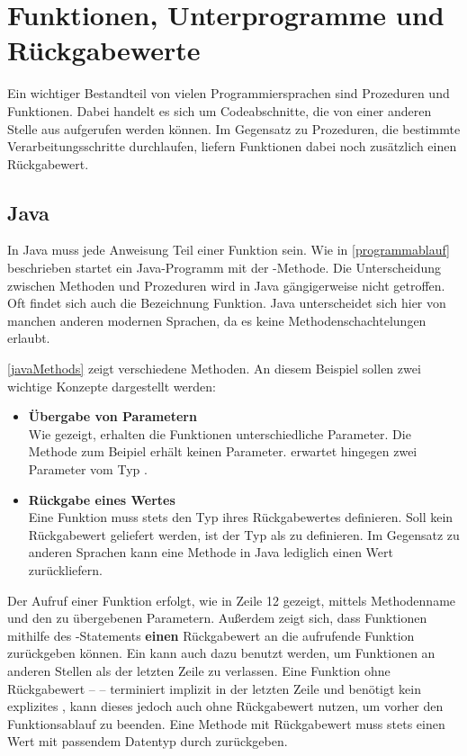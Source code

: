 \section{Funktionen, Unterprogramme und Rückgabewerte}\label{sec:functionsAndReturnValues}
Ein wichtiger Bestandteil von vielen Programmiersprachen sind Prozeduren und Funktionen. Dabei handelt es sich um Codeabschnitte, die von einer anderen Stelle aus aufgerufen werden können. Im Gegensatz zu Prozeduren, die bestimmte Verarbeitungsschritte durchlaufen, liefern Funktionen dabei noch zusätzlich einen Rückgabewert.

\subsection*{Java}
In Java muss jede Anweisung Teil einer Funktion sein. Wie in \autoref{programmablauf} beschrieben startet ein Java-Programm mit der -Methode. Die Unterscheidung zwischen Methoden und Prozeduren wird in Java gängigerweise nicht getroffen. Oft findet sich auch die Bezeichnung Funktion. Java unterscheidet sich hier von manchen anderen modernen Sprachen, da es keine Methodenschachtelungen erlaubt.

\autoref{javaMethods} zeigt verschiedene Methoden. An diesem Beispiel sollen zwei wichtige Konzepte dargestellt werden: 
\begin{itemize}
    \item \textbf{Übergabe von Parametern}\\
    Wie gezeigt, erhalten die Funktionen unterschiedliche Parameter. Die Methode  zum Beipiel erhält keinen Parameter.  erwartet hingegen   zwei Parameter vom Typ .
    \item \textbf{Rückgabe eines Wertes}\\
    Eine Funktion muss stets den Typ ihres Rückgabewertes definieren. Soll kein Rückgabewert geliefert werden, ist der Typ als  zu definieren. Im Gegensatz zu anderen Sprachen kann eine Methode in Java lediglich einen Wert zurückliefern.
\end{itemize}
Der Aufruf einer Funktion erfolgt, wie in Zeile 12 gezeigt, mittels Methodenname und den zu übergebenen Parametern. Außerdem zeigt sich, dass Funktionen mithilfe des -Statements \textbf{einen} Rückgabewert an die aufrufende Funktion zurückgeben können. Ein  kann auch dazu benutzt werden, um Funktionen an anderen Stellen als der letzten Zeile zu verlassen. Eine Funktion ohne Rückgabewert --  -- terminiert implizit in der letzten Zeile und benötigt kein explizites , kann dieses jedoch auch ohne Rückgabewert nutzen, um vorher den Funktionsablauf zu beenden. Eine Methode mit Rückgabewert muss stets einen Wert mit passendem Datentyp durch  zurückgeben.

